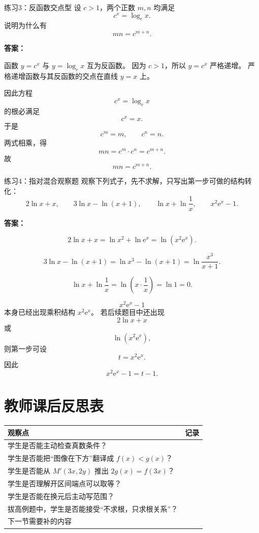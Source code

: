 \documentclass[11pt,a4paper]{ctexart}
\newcommand{\e}{\mathrm{e}}
\begin{document}
\begin{exbox}{练习3：反函数交点型}
设 $c>1$，两个正数 $m,n$ 均满足
\[
c^x=\log_c x.
\]
说明为什么有
\[
mn=c^{m+n}.
\]
\end{exbox}

\begin{graynote}
\textbf{答案：}

函数 $y=c^x$ 与 $y=\log_c x$ 互为反函数。
因为 $c>1$，所以 $y=c^x$ 严格递增。
严格递增函数与其反函数的交点在直线 $y=x$ 上。

因此方程
\[
c^x=\log_c x
\]
的根必满足
\[
c^x=x.
\]
于是
\[
c^m=m,\qquad c^n=n.
\]
两式相乘，得
\[
mn=c^m\cdot c^n=c^{m+n}.
\]
故
\[
\boxed{mn=c^{m+n}}.
\]
\end{graynote}

\begin{exbox}{练习4：指对混合观察题}
观察下列式子，先不求解，只写出第一步可做的结构转化：
\[
2\ln x+x,
\qquad
3\ln x-\ln(x+1),
\qquad
\ln x+\ln\frac1x,
\qquad
x^2\e^x-1.
\]
\end{exbox}

\begin{graynote}
\textbf{答案：}

\[
2\ln x+x
=\ln x^2+\ln \e^x
=\boxed{\ln(x^2\e^x)}.
\]

\[
3\ln x-\ln(x+1)
=\ln x^3-\ln(x+1)
=\boxed{\ln\frac{x^3}{x+1}}.
\]

\[
\ln x+\ln\frac1x
=\ln\left(x\cdot\frac1x\right)
=\boxed{\ln1=0}.
\]

\[
x^2\e^x-1
\]
本身已经出现乘积结构 $x^2\e^x$。
若后续题目中还出现
\[
2\ln x+x
\]
或
\[
\ln(x^2\e^x),
\]
则第一步可设
\[
\boxed{t=x^2\e^x}.
\]
因此
\[
x^2\e^x-1=\boxed{t-1}.
\]
\end{graynote}

\section{教师课后反思表}

\begin{center}
\renewcommand{\arraystretch}{1.45}
\begin{tabularx}{0.98\linewidth}{>{\raggedright\arraybackslash}p{7.2cm} X}
\toprule
观察点 & 记录 \\
\midrule
学生是否能主动检查真数条件？ & \rule{0pt}{1.2cm}\\\hline
学生是否能把“图像在下方”翻译成 $f(x)<g(x)$？ & \rule{0pt}{1.2cm}\\\hline
学生是否能从 $M'(3x,2y)$ 推出 $2g(x)=f(3x)$？ & \rule{0pt}{1.2cm}\\\hline
学生是否理解开区间端点可以取等？ & \rule{0pt}{1.2cm}\\\hline
学生是否能在换元后主动写范围？ & \rule{0pt}{1.2cm}\\\hline
拔高例题中，学生是否能接受“不求根，只求根关系”？ & \rule{0pt}{1.2cm}\\\hline
下一节需要补的内容 & \rule{0pt}{1.2cm}\\
\bottomrule
\end{tabularx}
\end{center}
\end{document}
